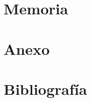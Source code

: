 \documentclass[11pt,oneside,a4paper]{report}
\begin{document}
\vspace{0.8cm}
\newpage
\part{Memoria}
\newpage
\cleardoublepage







%






\newpage
\part{Anexo}
\renewcommand\appendixname{Anexo} 
\newpage
\appendix








\setcounter{section}{0}										
\renewcommand\thesection{\Alph{subsection}}	





\newpage
\part{Bibliografía}\label{referencias}
\newpage
\end{document}
